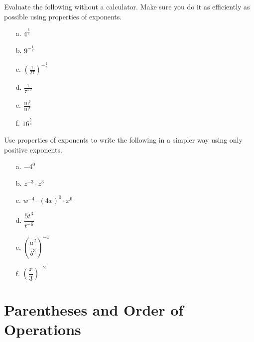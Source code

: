 \par

\begin{question} Evaluate the following without a calculator. Make sure you do it as efficiently as possible using properties of exponents.
\begin{enumerate}
\item[a.] $4^{\frac{3}{2}}$
\item[b.] $9^{-\frac{1}{2}}$
\item[c.] $(\frac{1}{27})^{-\frac{2}{3}}$
\item[d.] $\frac{1}{7^{-2}}$
\item[e.] $\frac{10^9}{10^7}$
\item[f.] $16^{\frac{5}{4}}$
\end{enumerate}
\end{question}

\begin{question} Use properties of exponents to write the following in a simpler way using only positive exponents.
\begin{enumerate}
\item[a.] $ -4^0$
\item[b.] $ z^{-3} \cdot z^3$
\item[c.] $ w^{-4} \cdot(4x)^0 \cdot x^6$
\item[d.] $  \dfrac{5t^3}{t^{-6}}  $
\item[e.] $ \left(\dfrac{a^2}{b^3} \right)^{-1} $
\item[f.] $ \left(\dfrac{x}{3} \right)^{-2} $
\end{enumerate}
\end{question}

\section{Parentheses and Order of Operations}

